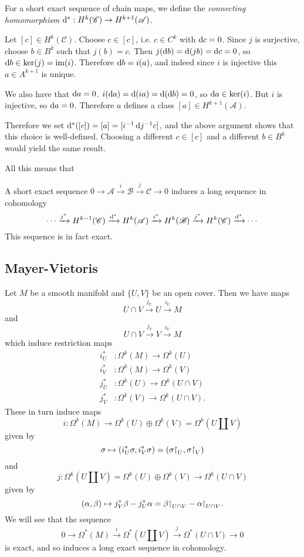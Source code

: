For a short exact sequence of chain maps,
we define the \emph{connecting homomorphism}
$\mathop{}\!\mathrm{d}^\ast : H^k(\mathscr{C}) \to H^{k+1}(\mathscr{A})$.

Let $[c] \in H^k(\mathscr{C})$. Choose
$c \in [c]$, i.e. $c \in C^k$ with $\mathop{}\!\mathrm{d} c = 0$. Since
$j$ is surjective, choose $b \in B^k$ such that
$j(b) = c$. Then
$j(\mathop{}\!\mathrm{d} b) = \mathop{}\!\mathrm{d}(j b) = \mathop{}\!\mathrm{d} c = 0$, so
$\mathop{}\!\mathrm{d} b \in \ker(j) = \mathrm{im}(i)$. Therefore
$\mathop{}\!\mathrm{d} b = i(a)$, and indeed since $i$ is injective
this $a \in A^{k+1}$ is unique.

We also have that $\mathop{}\!\mathrm{d} a = 0$.
$i(\mathop{}\!\mathrm{d} a) = \mathop{}\!\mathrm{d}(i a) = \mathop{}\!\mathrm{d}(\mathop{}\!\mathrm{d} b) = 0$, so
$\mathop{}\!\mathrm{d} a \in \ker(i)$. But $i$ is injective, so
$\mathop{}\!\mathrm{d} a = 0$. Therefore $a$ defines a class
$[a] \in H^{k+1}(\mathscr{A})$.

Therefore we set
$\mathop{}\!\mathrm{d}^\ast([c]) = [a] = [i^{-1} \mathop{}\!\mathrm{d} j^{-1} c]$,
and the above argument shows that this choice is well-defined.
Choosing a different $c \in [c]$ and a different $b \in B^k$ would
yield the same result.

All this means that
\begin{lemma}
A short exact sequence
$
0           \xrightarrow{}
\mathscr{A} \xrightarrow{i}
\mathscr{B} \xrightarrow{j}
\mathscr{C} \xrightarrow{}
0
$
induces a long sequence in cohomology
$$
\cdots              \xrightarrow{j^\ast}
H^{k-1}(\mathscr{C}) \xrightarrow{\mathop{}\!\mathrm{d}^\ast}
H^{k}(\mathscr{A})   \xrightarrow{i^\ast}
H^{k}(\mathscr{B})   \xrightarrow{j^\ast}
H^{k}(\mathscr{C})   \xrightarrow{\mathop{}\!\mathrm{d}^\ast}
\cdots
$$
This sequence is in fact exact.
\end{lemma}

\subsection{Mayer-Vietoris}
Let $M$ be a smooth manifold and $\{U, V\}$ be an open cover.
Then we have maps
$$
U \cap V \xrightarrow{j_U}
U        \xrightarrow{i_U}
M
$$
and
$$
U \cap V \xrightarrow{j_V}
V        \xrightarrow{i_V}
M
$$
which induce restriction maps
\begin{align*}
  i_U^\ast &: \Omega^k(M) \to \Omega^k(U) \\
  i_V^\ast &: \Omega^k(M) \to \Omega^k(V) \\
  j_U^\ast &: \Omega^k(U) \to \Omega^k(U \cap V) \\
  j_V^\ast &: \Omega^k(V) \to \Omega^k(U \cap V).
\end{align*}
These in turn induce maps
$$
  i
:   \Omega^k(M)
\to \Omega^k(U) \oplus \Omega^k(V)
=   \Omega^k(U \coprod V)
$$
given by
$$
        \sigma
\mapsto (i_U^\ast \sigma, i_V^\ast \sigma)
=       (\sigma\mathord{\upharpoonright}_U, \sigma\mathord{\upharpoonright}_V)
$$
and
$$
  j
:   \Omega^k(U \coprod V)
=   \Omega^k(U) \oplus \Omega^k(V)
\to \Omega^k(U \cap V)
$$
given by
$$
        (\alpha, \beta)
\mapsto j_V^\ast \beta - j_U^\ast \alpha
=       \beta\mathord{\upharpoonright}_{U \cap V} - \alpha\mathord{\upharpoonright}_{U \cap V}.
$$
We will see that the sequence
$$
0                       \xrightarrow{}
\Omega^\ast(M)           \xrightarrow{i}
\Omega^\ast(U \coprod V) \xrightarrow{j}
\Omega^\ast(U \cap V)    \xrightarrow{}
0
$$
is exact, and so induces a long exact sequence in cohomology.
